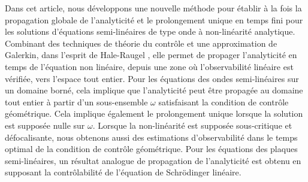 \documentclass[JEP,XML,SOM,Unicode,published]{cedram}
\theoremstyle{definition}
\begin{document}




\begin{altabstract}
Dans cet article, nous développons une nouvelle méthode pour établir à la fois la propagation globale de l'analyticité et le prolongement unique en temps fini pour les solutions d'équations semi-linéaires de type onde à non-linéarité analytique. Combinant des techniques de théorie du contrôle et une approximation de Galerkin, dans l'esprit de Hale-Raugel \cite{HR03}, elle permet de propager l'analyticité en temps de l'équation non linéaire, depuis une zone où l'observabilité linéaire est vérifiée, vers l'espace tout entier. Pour les équations des ondes semi-linéaires sur un domaine borné, cela implique que l'analyticité peut être propagée au domaine tout entier à partir d'un sous-ensemble $\omega$ satisfaisant la condition de contrôle géométrique. Cela implique également le prolongement unique lorsque la solution est supposée nulle sur $\omega$. Lorsque la non-linéarité est supposée sous-critique et défocalisante, nous obtenons aussi des estimations d'observabilité dans le temps optimal de la condition de contrôle géométrique. Pour les équations des plaques semi-linéaires, un résultat analogue de propagation de l'analyticité est obtenu en supposant la contrôlabilité de l'équation de Schrödinger linéaire.
\end{altabstract}

\maketitle
\vspace*{-\baselineskip}
\tableofcontents
\end{document}
